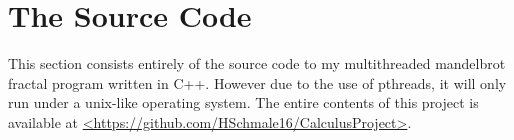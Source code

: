 \documentclass[10pt,oneside,letter]{article}
\begin{document}
\section{The Source Code}
This section consists entirely of the source code to my multithreaded
mandelbrot fractal program written in C++. However due to the use of
pthreads, it will only run under a unix-like operating system. The 
entire contents of this project is available at 
\url{<https://github.com/HSchmale16/CalculusProject>}.

\end{document}
